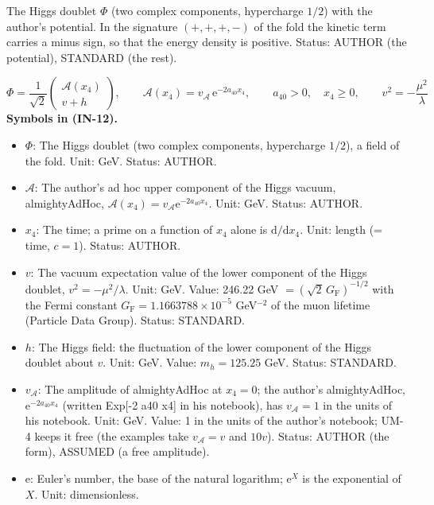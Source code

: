 \documentclass[
  10pt,
]{article}
\providecommand{\tightlist}{%
  \setlength{\itemsep}{0pt}\setlength{\parskip}{0pt}}
\begin{document}
The Higgs doublet \(\Phi\) (two complex components, hypercharge \(1/2\))
with the author's potential. In the signature \((+,+,+,-)\) of the fold
the kinetic term carries a minus sign, so that the energy density is
positive. Status: AUTHOR (the potential), STANDARD (the rest).

\[
\Phi = \frac{1}{\sqrt2}\begin{pmatrix}\mathcal{A}(x_4)\\ v + h\end{pmatrix},\qquad
\mathcal{A}(x_4) = v_{\mathcal{A}}\,\mathrm{e}^{-2a_{40}x_4},\qquad a_{40} > 0,\quad x_4 \ge 0,\qquad v^2 = -\frac{\mu^2}{\lambda} \tag{IN-12}
\] \textbf{Symbols in (IN-12).}

\begin{itemize}
\tightlist
\item
  \(\Phi\): The Higgs doublet (two complex components, hypercharge
  \(1/2\)), a field of the fold. Unit: GeV. Status: AUTHOR.
\item
  \(\mathcal{A}\): The author's ad hoc upper component of the Higgs
  vacuum, almightyAdHoc,
  \(\mathcal{A}(x_4) = v_{\mathcal{A}}\mathrm{e}^{-2a_{40}x_4}\). Unit:
  GeV. Status: AUTHOR.
\item
  \(x_4\): The time; a prime on a function of \(x_4\) alone is
  \(\mathrm{d}/\mathrm{d}x_4\). Unit: length (= time, \(c = 1\)).
  Status: AUTHOR.
\item
  \(v\): The vacuum expectation value of the lower component of the
  Higgs doublet, \(v^2 = -\mu^2/\lambda\). Unit: GeV. Value: 246.22 GeV
  \(= (\sqrt2\,G_{\mathrm{F}})^{-1/2}\) with the Fermi constant
  \(G_{\mathrm{F}} = 1.1663788\times10^{-5}\) GeV\(^{-2}\) of the muon
  lifetime (Particle Data Group). Status: STANDARD.
\item
  \(h\): The Higgs field: the fluctuation of the lower component of the
  Higgs doublet about \(v\). Unit: GeV. Value: \(m_h = 125.25\) GeV.
  Status: STANDARD.
\item
  \(v_{\mathcal{A}}\): The amplitude of almightyAdHoc at \(x_4 = 0\);
  the author's almightyAdHoc, \(\mathrm{e}^{-2a_{40}x_4}\) (written
  Exp{[}-2 a40 x4{]} in his notebook), has \(v_{\mathcal{A}} = 1\) in
  the units of his notebook. Unit: GeV. Value: 1 in the units of the
  author's notebook; UM-4 keeps it free (the examples take
  \(v_{\mathcal{A}} = v\) and \(10v\)). Status: AUTHOR (the form),
  ASSUMED (a free amplitude).
\item
  \(\mathrm{e}\): Euler's number, the base of the natural logarithm;
  \(\mathrm{e}^{X}\) is the exponential of \(X\). Unit: dimensionless.

\end{itemize}
\end{document}
